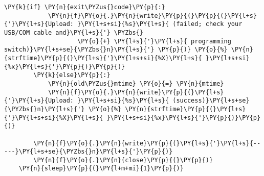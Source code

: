\begin{Verbatim}[commandchars=\\\{\}]
        \PY{k}{if} \PY{n}{exit\PYZus{}code}\PY{p}{:}
            \PY{n}{f}\PY{o}{.}\PY{n}{write}\PY{p}{(}\PY{p}{(}\PY{l+s}{'}\PY{l+s}{Upload: }\PY{l+s+si}{%s}\PY{l+s}{ (failed; check your USB/COM cable and}\PY{l+s}{'} \PYZbs{}
                    \PY{o}{+} \PY{l+s}{'}\PY{l+s}{ programming switch)}\PY{l+s+se}{\PYZbs{}n}\PY{l+s}{'} \PY{p}{)} \PY{o}{%} \PY{n}{strftime}\PY{p}{(}\PY{l+s}{'}\PY{l+s+si}{%X}\PY{l+s}{ }\PY{l+s+si}{%x}\PY{l+s}{'}\PY{p}{)}\PY{p}{)}
        \PY{k}{else}\PY{p}{:}
            \PY{n}{old\PYZus{}mtime} \PY{o}{=} \PY{n}{mtime}
            \PY{n}{f}\PY{o}{.}\PY{n}{write}\PY{p}{(}\PY{l+s}{'}\PY{l+s}{Upload: }\PY{l+s+si}{%s}\PY{l+s}{ (success)}\PY{l+s+se}{\PYZbs{}n}\PY{l+s}{'} \PY{o}{%} \PY{n}{strftime}\PY{p}{(}\PY{l+s}{'}\PY{l+s+si}{%X}\PY{l+s}{ }\PY{l+s+si}{%x}\PY{l+s}{'}\PY{p}{)}\PY{p}{)}

        \PY{n}{f}\PY{o}{.}\PY{n}{write}\PY{p}{(}\PY{l+s}{'}\PY{l+s}{-----}\PY{l+s+se}{\PYZbs{}n}\PY{l+s}{'}\PY{p}{)}
        \PY{n}{f}\PY{o}{.}\PY{n}{close}\PY{p}{(}\PY{p}{)}
    \PY{n}{sleep}\PY{p}{(}\PY{l+m+mi}{1}\PY{p}{)}
\end{Verbatim}
